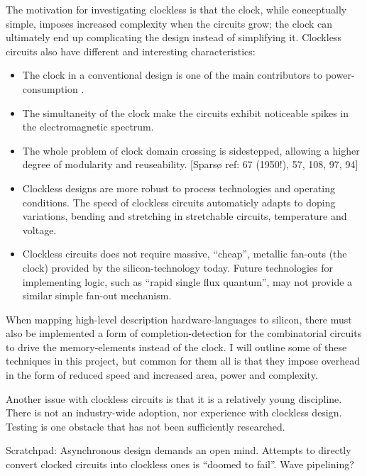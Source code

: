 The motivation for investigating clockless is that the clock, while
conceptually simple, imposes increased complexity when the circuits
grow; the clock can ultimately end up complicating the design instead
of simplifying it. Clockless circuits also have different and
interesting characteristics: \begin{itemize}

\item The clock in a conventional design is one of the main
  contributors to power-consumption \cite{tiwari1998reducing}.

\item The simultaneity of the clock make the circuits exhibit
  noticeable spikes in the electromagnetic spectrum.

\item The whole problem of clock domain crossing is sidestepped,
  allowing a higher degree of modularity and reuseability. [Sparsø
    ref: 67 (1950!), 57, 108, 97, 94]

\item Clockless designs are more robust to process technologies and
  operating conditions. The speed of clockless circuits automaticly
  adapts to doping variations, bending and stretching in stretchable
  circuits, temperature and voltage.

\item Clockless circuits does not require massive, ``cheap'', metallic
  fan-outs (the clock) provided by the silicon-technology today. Future
  technologies for implementing logic, such as ``rapid single flux
  quantum'', may not provide a similar simple fan-out mechanism.
\end{itemize}

When mapping high-level description hardware-languages to silicon,
there must also be implemented a form of completion-detection for the
combinatorial circuits to drive the memory-elements instead of the
clock. I will outline some of these techniques in this project, but
common for them all is that they impose overhead in the form of
reduced speed and increased area, power and complexity.

Another issue with clockless circuits is that it is a relatively young
discipline. There is not an industry-wide adoption, nor experience
with clockless design. Testing is one obstacle that has not been
sufficiently researched. 

Scratchpad: Asynchronous design demands an open mind. Attempts to
directly convert clocked circuits into clockless ones is ``doomed to
fail''. Wave pipelining?
